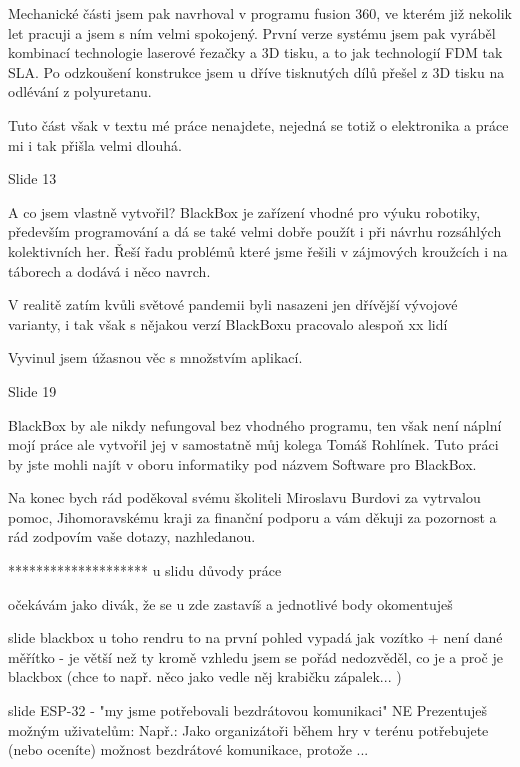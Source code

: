 Mechanické části jsem pak navrhoval v programu fusion 360, ve kterém již nekolik let pracuji a jsem s ním velmi spokojený.
První verze systému jsem pak vyráběl kombinací technologie laserové řezačky a 3D tisku, a to jak technologií FDM tak SLA.
Po odzkoušení konstrukce jsem u dříve tisknutých dílů přešel z 3D tisku na odlévání z polyuretanu. 

Tuto část však v textu mé práce nenajdete, nejedná se totiž o elektronika a práce mi i tak přišla velmi dlouhá.

Slide 13

A co jsem vlastně vytvořil? 
BlackBox je zařízení vhodné pro výuku robotiky, především programování a dá se také velmi dobře použít i při návrhu rozsáhlých 
kolektivních her. Řeší řadu problémů které jsme řešili v zájmových kroužcích i na táborech a dodává i něco navrch.

V realitě zatím kvůli světové pandemii byli nasazeni jen dřívější vývojové varianty, i tak však s nějakou verzí BlackBoxu 
pracovalo alespoň xx lidí



Vyvinul jsem úžasnou věc s množstvím aplikací. 


Slide 19

BlackBox by ale nikdy nefungoval bez vhodného programu, ten však není náplní mojí práce ale vytvořil jej v samostatně 
můj kolega Tomáš Rohlínek. Tuto práci by jste mohli najít v oboru informatiky pod názvem Software pro BlackBox.

Na konec bych rád poděkoval svému školiteli Miroslavu Burdovi za vytrvalou pomoc, Jihomoravskému kraji za finanční 
podporu a vám děkuji za pozornost a rád zodpovím vaše dotazy, nazhledanou.


********************
u slidu důvody práce 

očekávám jako divák, že se u zde zastavíš a jednotlivé body okomentuješ 


slide blackbox 
u toho rendru to na první pohled vypadá jak vozítko + není dané měřítko - je větší než ty 
kromě vzhledu jsem se pořád nedozvěděl, co je a proč je blackbox 
(chce to např. něco jako vedle něj krabičku zápalek... ) 


slide ESP-32 - "my jsme potřebovali bezdrátovou komunikaci" 
NE 
Prezentuješ možným uživatelům: 
Např.: Jako organizátoři během hry v terénu potřebujete (nebo oceníte) 
možnost bezdrátové komunikace, protože ... 


